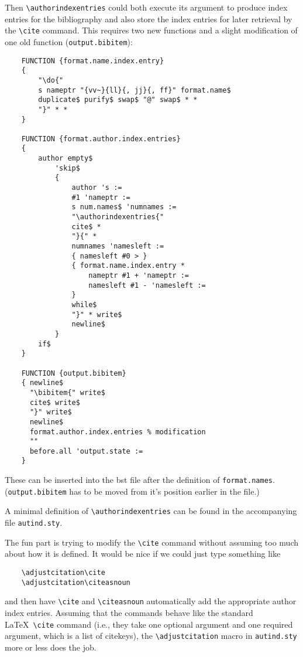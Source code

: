 \documentclass{article}
\begin{document}
Then \verb+\authorindexentries+ could both execute its argument to
produce index entries for the bibliography and also store the index
entries for later retrieval by the \verb+\cite+ command.  This
requires two new functions and a slight modification of one old
function (\verb+output.bibitem+):
\begin{verbatim}
    FUNCTION {format.name.index.entry}
    {
        "\do{"
        s nameptr "{vv~}{ll}{, jj}{, ff}" format.name$
        duplicate$ purify$ swap$ "@" swap$ * *
        "}" * *
    }

    FUNCTION {format.author.index.entries}
    {
        author empty$
            'skip$
            { 
                author 's :=
                #1 'nameptr :=
                s num.names$ 'numnames :=
                "\authorindexentries{"
                cite$ * 
                "}{" *
                numnames 'namesleft :=
                { namesleft #0 > }
                { format.name.index.entry *
                    nameptr #1 + 'nameptr :=
                    namesleft #1 - 'namesleft :=
                }
                while$
                "}" * write$
                newline$
            }
        if$
    }

    FUNCTION {output.bibitem}
    { newline$
      "\bibitem{" write$
      cite$ write$
      "}" write$
      newline$
      format.author.index.entries % modification
      ""
      before.all 'output.state :=
    }
\end{verbatim}
These can be inserted into the bst file after the definition of
\verb+format.names+.  (\verb+output.bibitem+ has to be moved from it's
position earlier in the file.)

A minimal definition of \verb+\authorindexentries+ can be found in the
accompanying file \texttt{autind.sty}.

The fun part is trying to modify the \verb+\cite+ command without
assuming too much about how it is defined.  It would be nice if we
could just type something like
\begin{verbatim}
    \adjustcitation\cite
    \adjustcitation\citeasnoun
\end{verbatim}
and then have \verb+\cite+ and \verb+\citeasnoun+ automatically add
the appropriate author index entries.  Assuming that the commands
behave like the standard \LaTeX\ \verb+\cite+ command (i.e., they take
one optional argument and one required argument, which is a list of
citekeys), the \verb+\adjustcitation+ macro in \texttt{autind.sty} more
or less does the job.
\end{document}
